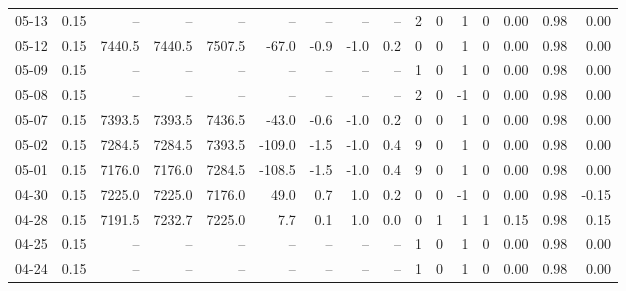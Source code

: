 \begin{threeparttable}
{\begin{tabular}{lrrrrrrrrrrrrrrr}
  05-13 &     0.15 &     -- &     -- &     -- &         -- &             -- &                       -- &                  -- &              2 &         0 &     1 &         0 &       0.00 &      0.98 &           0.00 \\
  05-12 &     0.15 & 7440.5 & 7440.5 & 7507.5 &      -67.0 &           -0.9 &                     -1.0 &                 0.2 &              0 &         0 &     1 &         0 &       0.00 &      0.98 &           0.00 \\
  05-09 &     0.15 &     -- &     -- &     -- &         -- &             -- &                       -- &                  -- &              1 &         0 &     1 &         0 &       0.00 &      0.98 &           0.00 \\
  05-08 &     0.15 &     -- &     -- &     -- &         -- &             -- &                       -- &                  -- &              2 &         0 &    -1 &         0 &       0.00 &      0.98 &           0.00 \\
  05-07 &     0.15 & 7393.5 & 7393.5 & 7436.5 &      -43.0 &           -0.6 &                     -1.0 &                 0.2 &              0 &         0 &     1 &         0 &       0.00 &      0.98 &           0.00 \\
  05-02 &     0.15 & 7284.5 & 7284.5 & 7393.5 &     -109.0 &           -1.5 &                     -1.0 &                 0.4 &              9 &         0 &     1 &         0 &       0.00 &      0.98 &           0.00 \\
  05-01 &     0.15 & 7176.0 & 7176.0 & 7284.5 &     -108.5 &           -1.5 &                     -1.0 &                 0.4 &              9 &         0 &     1 &         0 &       0.00 &      0.98 &           0.00 \\
  04-30 &     0.15 & 7225.0 & 7225.0 & 7176.0 &       49.0 &            0.7 &                      1.0 &                 0.2 &              0 &         0 &    -1 &         0 &       0.00 &      0.98 &          -0.15 \\
  04-28 &     0.15 & 7191.5 & 7232.7 & 7225.0 &        7.7 &            0.1 &                      1.0 &                 0.0 &              0 &         1 &     1 &         1 &       0.15 &      0.98 &           0.15 \\
  04-25 &     0.15 &     -- &     -- &     -- &         -- &             -- &                       -- &                  -- &              1 &         0 &     1 &         0 &       0.00 &      0.98 &           0.00 \\
  04-24 &     0.15 &     -- &     -- &     -- &         -- &             -- &                       -- &                  -- &              1 &         0 &     1 &         0 &       0.00 &      0.98 &           0.00 \\

\end{tabular}}
\end{threeparttable}
